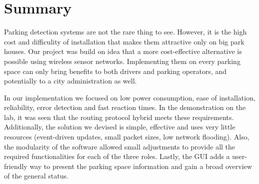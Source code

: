 ﻿\chapter{Summary}
\label{chap:summary}

Parking detection systems are not the rare thing to see. 
However, it is the high cost and difficulity of  installation that makes them attractive only on big park houses.
Our project was build on idea that a more cost-effective alternative is possible using wireless sensor networks.
Implementing them on every parking space can only bring benefits to both drivers and parking operators, and potentially to a city administration as well.

In our implementation we focused on low power consumption, ease of installation, reliability, error detection and fast reaction times.
In the demonstration on the lab, it was seen that the routing protocol hybrid meets these requirements.
Additionally, the solution we devised is simple, effective and uses very little resources (event-driven updates, small packet sizes, low network flooding).
Also, the modularity of the software allowed small adjustments to provide all the required functionalities for each of the three roles.
Lastly, the GUI adds a user-friendly way to present the parking space information and gain a broad overview of the general status.
